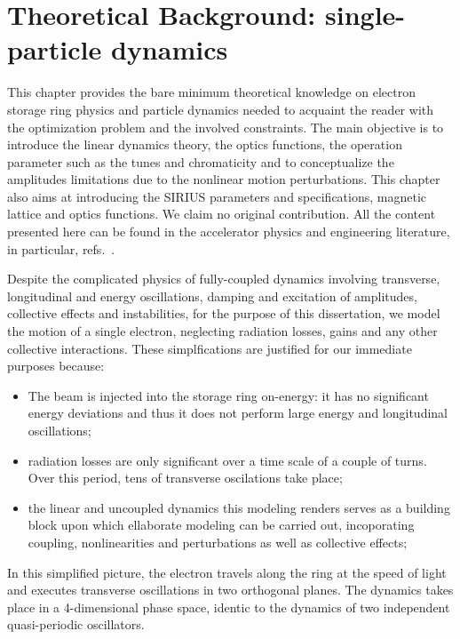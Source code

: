 \chapter{Theoretical Background: single-particle dynamics}
This chapter provides the bare minimum theoretical knowledge on electron storage ring physics and particle dynamics needed to acquaint the reader with the optimization problem and the involved constraints. The main objective is to introduce the linear dynamics theory, the optics functions, the operation parameter such as the tunes and chromaticity and to conceptualize the amplitudes limitations due to the nonlinear motion perturbations. This chapter also aims at introducing the SIRIUS parameters and specifications, magnetic lattice and optics functions. We claim no original contribution. All the content presented here can be found in the accelerator physics and engineering literature, in particular, refs.~\cite{sands_physics_1969,lee_accelerator_2004,wiedemann_particle_2015,wolski_beam_2014}.

Despite the complicated physics of fully-coupled dynamics involving transverse, longitudinal and energy oscillations, damping and excitation of amplitudes, collective effects and instabilities, for the purpose of this dissertation, we model the motion of a single electron, neglecting radiation losses, gains and any other collective interactions. These simplfications are justified for our immediate purposes because:
\begin{itemize}
    \item The beam is injected into the storage ring on-energy: it has no significant energy deviations and thus it does not perform large energy and longitudinal oscillations;
    \item radiation losses are only significant over a time scale of a couple of turns. Over this period, tens of transverse oscilations take place;
    \item the linear and uncoupled dynamics this modeling renders serves as a building block upon which ellaborate modeling can be carried out, incoporating coupling, nonlinearities and perturbations as well as collective effects;
\end{itemize}
In this simplified picture, the electron travels along the ring at the speed of light and executes transverse oscillations in two orthogonal planes. The dynamics takes place in a 4-dimensional phase space, identic to the  dynamics of two independent quasi-periodic oscillators.

